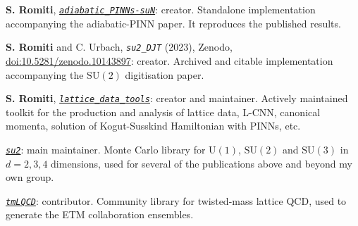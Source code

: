 
\begin{enumerate}[leftmargin=1.6em,labelsep=0.5em,label={[\arabic*]},itemsep=3pt,topsep=3pt]
  \item \textbf{S. Romiti}, \textit{\href{https://github.com/simone-romiti/adiabatic_PINNs-suN}{\texttt{adiabatic\_PINNs-suN}}}: creator. Standalone implementation accompanying the adiabatic-PINN paper. It reproduces the published results.
  \item \textbf{S. Romiti} and C. Urbach, \textit{\texttt{su2\_DJT}} (2023), Zenodo, \href{https://doi.org/10.5281/zenodo.10143897}{doi:10.5281/zenodo.10143897}: creator. Archived and citable implementation accompanying the $\mathrm{SU}(2)$ digitisation paper.
  \item \textbf{S. Romiti}, \textit{\href{https://github.com/simone-romiti/lattice_data_tools}{\texttt{lattice\_data\_tools}}}: creator and maintainer. Actively maintained toolkit for the production and analysis of lattice data, L-CNN, canonical momenta, solution of Kogut-Susskind Hamiltonian with PINNs, etc.
  \item \textit{\href{https://github.com/HISKP-LQCD/su2}{\texttt{su2}}}: main maintainer. Monte Carlo library for $\mathrm{U}(1)$, $\mathrm{SU}(2)$ and $\mathrm{SU}(3)$ in $d=2,3,4$ dimensions, used for several of the publications above and beyond my own group.
  \item \textit{\href{https://github.com/etmc/tmLQCD}{\texttt{tmLQCD}}}: contributor. Community library for twisted-mass lattice QCD, used to generate the ETM collaboration ensembles.
\end{enumerate}


